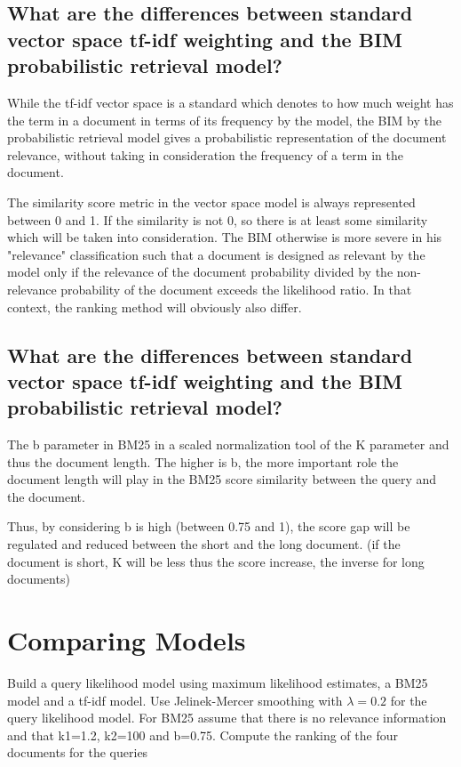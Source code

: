 \documentclass{scrartcl}
\begin{document}
\subsection{What are the differences between standard vector space tf-idf weighting and the BIM probabilistic
retrieval model? }

While the tf-idf vector space is a standard which denotes to how much weight has the term in a document in terms of its frequency by the model, the BIM by the probabilistic retrieval model gives a probabilistic representation of the document relevance, without taking in consideration the frequency of a term in the document.

The similarity score metric in the vector space model is always represented between 0 and 1. If the similarity is not 0, so there is at least some similarity which will be taken into consideration. The BIM otherwise is more severe in his "relevance" classification such that a document is designed as relevant by the model only if the relevance of the document probability divided by the non-relevance probability of the document exceeds the likelihood ratio. In that context, the ranking method will obviously also differ.

\subsection{What are the differences between standard vector space tf-idf weighting and the BIM probabilistic
retrieval model? }

The b parameter in BM25 in a scaled normalization tool of the K parameter and thus the document length. The higher is b, the more important role the document length will play in the BM25 score similarity between the query and the document. 

Thus, by considering b is high (between 0.75 and 1), the score gap will be regulated and reduced between the short and the long document. (if the document is short, K will be less thus the score increase, the inverse for long documents)




\section{ Comparing Models}

Build a query likelihood model using maximum likelihood estimates, a BM25 model and a tf-idf
model. Use Jelinek-Mercer smoothing with $\lambda = 0.2$ for the query likelihood model. For BM25
assume that there is no relevance information and that k1=1.2, k2=100 and b=0.75. Compute the
ranking of the four documents for the queries
\end{document}
